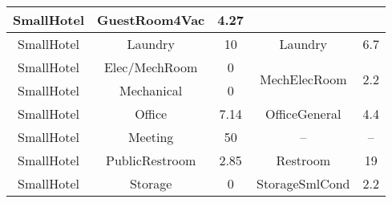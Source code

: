 \begin{table}
\begin{tabular}{|c|c|c|c|c|}
SmallHotel             & GuestRoom4Vac           & 4.27                                                                                                          &                                   &                                                                                                                \\ \hline
SmallHotel             & Laundry                 & 10                                                                                                            & Laundry                           & 6.7                                                                                                            \\ \hline
SmallHotel             & Elec/MechRoom           & 0                                                                                                             & \multirow{2}{*}{MechElecRoom}     & \multirow{2}{*}{2.2}                                                                                           \\ \cline{1-3}
SmallHotel             & Mechanical              & 0                                                                                                             &                                   &                                                                                                                \\ \hline
SmallHotel             & Office                  & 7.14                                                                                                          & OfficeGeneral                     & 4.4                                                                                                            \\ \hline
SmallHotel             & Meeting                 & 50                                                                                                            & --                                & --                                                                                                             \\ \hline
SmallHotel             & PublicRestroom          & 2.85                                                                                                          & Restroom                          & 19                                                                                                             \\ \hline
SmallHotel             & Storage                 & 0                                                                                                             & StorageSmlCond                    & 2.2                                                                                                            \\ \hline

\end{tabular}
\end{table}
